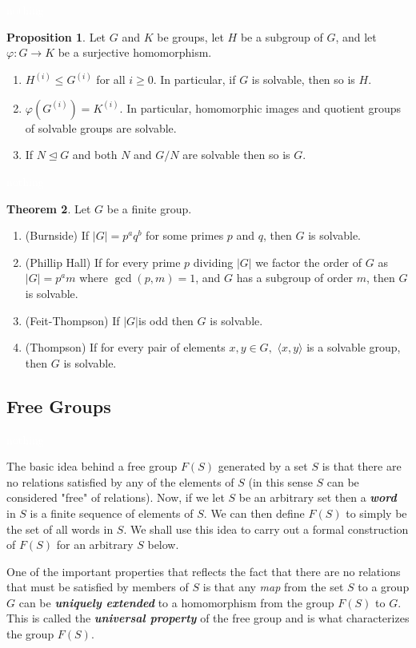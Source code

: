 \documentclass{article}
\theoremstyle{definition}
\newtheorem{thm}{Theorem}[section]
\newtheorem{prop}[thm]{Proposition}
\newcommand{\nl}{\textcolor{white}{nothing}}
\newcommand{\ra}{\rightarrow}
\newcommand{\vphi}{\varphi}
\begin{document}
\nl

\begin{prop}
Let $G$ and $K$ be groups, let $H$ be a subgroup of $G$, and let $\vphi:G\ra K$ be a surjective homomorphism.
\begin{enumerate}
\item $H^{(i)}\leq G^{(i)}$ for all $i\geq 0$. In particular, if $G$ is solvable, then so is $H$. 
\item $\vphi(G^{(i)}) = K^{(i)}$. In particular, homomorphic images and quotient groups of solvable groups are solvable.
\item If $N\unlhd G$ and both $N$ and $G/N$ are solvable then so is $G$.
\end{enumerate}
\end{prop}

\nl

\begin{thm}
Let $G$ be a finite group.
\begin{enumerate}
\item (Burnside) If $|G| = p^aq^b$ for some primes $p$ and $q$, then $G$ is solvable.
\item (Phillip Hall) If for every prime $p$ dividing $|G|$ we factor the order of $G$ as $|G| = p^a m$ where $\gcd(p,m) = 1$, and $G$ has a subgroup of order $m$, then $G$ is solvable.
\item (Feit-Thompson) If $|G|$is odd then $G$ is solvable.
\item (Thompson) If for every pair of elements $x,y\in G,$ $\langle x,y\rangle$ is a solvable group, then $G$ is solvable.
\end{enumerate}
\end{thm}

\newpage

\subsection{Free Groups}\nl

The basic idea behind a free group $F(S)$ generated by a set $S$ is that there are no relations satisfied by any of the elements of $S$ (in this sense $S$ can be considered "free" of relations). Now, if we let $S$ be an arbitrary set then a \textit{\textbf{word}} in $S$ is a finite sequence of elements of $S$. We can then define $F(S)$ to simply be the set of all words in $S$. We shall use this idea to carry out a formal construction of $F(S)$ for an arbitrary $S$ below.

One of the important properties that reflects the fact that there are no relations that must be satisfied by members of $S$ is that any \textit{map} from the set $S$ to a group $G$ can be \textit{\textbf{uniquely extended}} to a homomorphism from the group $F(S)$ to $G$. This is called the \textit{\textbf{universal property}} of the free group and is what characterizes the group $F(S)$.
\end{document}

